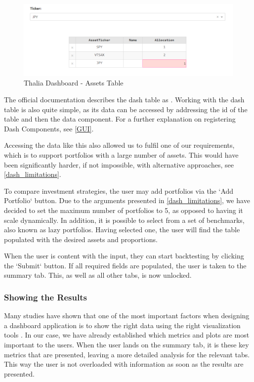 \documentclass[main.tex]{subfiles}
\begin{document}
\begin{figure}[H]
   \centering
   \includegraphics[width=\textwidth]{08Appendices/081User/081Pictures/table.png}
   \caption{Thalia Dashboard - Assets Table}
   \label{thalia_table_design}
\end{figure}

The official documentation describes the dash table as  \cite{dash_table}. Working with the dash table is also quite simple, as its data can be accessed by addressing the id of the table and then the data component. For a further explanation on registering Dash Components, see \ref{GUI}.

Accessing the data like this also allowed us to fulfil one of our requirements, which is to support portfolios with a large number of assets. This would have been significantly harder, if not impossible, with alternative approaches, see \ref{dash_limitations}.

To compare investment strategies, the user may add portfolios via the `Add Portfolio` button. Due to the arguments presented in \ref{dash_limitations}, we have decided to set the maximum number of portfolios to 5, as opposed to having it scale dynamically. In addition, it is possible to select from a set of benchmarks, also known as lazy portfolios. Having selected one, the user will find the table populated with the desired assets and proportions. 

When the user is content with the input, they can start backtesting by clicking the `Submit` button. If all required fields are populated, the user is taken to the summary tab. This, as well as all other tabs, is now unlocked.

\subsubsection*{Showing the Results}

Many studies have shown that one of the most important factors when designing a dashboard application is to show the right data using the right visualization tools \cite{dashboard_design1} \cite{dashboard_design2}. In our case, we have already established which metrics and plots are most important to the users. When the user lands on the summary tab, it is these key metrics that are presented, leaving a more detailed analysis for the relevant tabs. This way the user is not overloaded with information as soon as the results are presented. 
\end{document}
